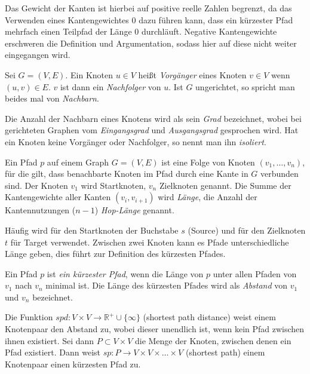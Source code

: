 Das Gewicht der Kanten ist hierbei auf positive reelle Zahlen begrenzt, da das Verwenden eines Kantengewichtes $0$ dazu führen kann, dass ein kürzester Pfad mehrfach einen Teilpfad der Länge 0 durchläuft.
Negative Kantengewichte erschweren die Definition und Argumentation, sodass hier auf diese nicht weiter eingegangen wird.

\begin{definition}[Nachbar]
    Sei $G = (V, E)$. Ein Knoten $u \in V$ heißt \emph{Vorgänger} eines Knoten $v \in V$ wenn $(u, v) \in E$. $v$ ist dann ein \emph{Nachfolger} von $u$.
    Ist $G$ ungerichtet, so spricht man beides mal von \emph{Nachbarn}.
\end{definition}

Die Anzahl der Nachbarn eines Knotens wird als sein \emph{Grad} bezeichnet, wobei bei gerichteten Graphen vom \emph{Eingangsgrad} und \emph{Ausgangsgrad} gesprochen wird.
Hat ein Knoten keine Vorgänger oder Nachfolger, so nennt man ihn \emph{isoliert}.

\begin{definition}[Pfad]
    Ein Pfad $p$ auf einem Graph $G = (V, E)$ ist eine Folge von Knoten $(v_1, \dotsc, v_n)$, für die gilt, dass benachbarte Knoten im Pfad durch eine Kante in $G$ verbunden sind.
    Der Knoten $v_1$ wird Startknoten, $v_n$ Zielknoten genannt.
    Die Summe der Kantengewichte aller Kanten $(v_i, v_{i + 1})$ wird \emph{Länge}, die Anzahl der Kantennutzungen ($n - 1$) \emph{Hop-Länge} genannt.
\end{definition}

Häufig wird für den Startknoten der Buchstabe $s$ (Source) und für den Zielknoten $t$ für Target verwendet.
Zwischen zwei Knoten kann es Pfade unterschiedliche Länge geben, dies führt zur Definition des kürzesten Pfades.

\begin{definition}
    Ein Pfad $p$ ist \emph{ein kürzester Pfad}, wenn die Länge von $p$ unter allen Pfaden von $v_1$ nach $v_n$ minimal ist.
    Die Länge des kürzesten Pfades wird als \emph{Abstand} von $v_1$ und $v_n$ bezeichnet.

    Die Funktion ${spd} \colon V \times V \to \mathbb{R}^+ \cup \{ \infty \} $ (shortest path distance) weist einem Knotenpaar den Abstand zu, wobei dieser unendlich ist, wenn kein Pfad zwischen ihnen existiert.
    Sei dann $P \subset V \times V$ die Menge der Knoten, zwischen denen ein Pfad existiert.
    Dann weist ${sp} \colon P \to V \times V \times \dots \times V$ (shortest path) einem Knotenpaar einen kürzesten Pfad zu.
\end{definition}

